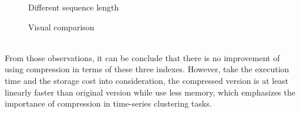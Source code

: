 \begin{figure}[!htbp]
    \centering 
    \caption{ Different sequence length} 
    \label{fig:comparison1} 
\end{figure} 
\begin{figure}[!htbp]
    \centering 
    \caption{ Visual comparison } 
    \label{fig:pippaavisul} 
\end{figure} 
\\From those observations, it can be conclude that there is no improvement of using compression in terms of these three indexes. However, take the execution time and the storage cost into consideration, the compressed version is at least linearly faster than original version while use less memory, which emphasizes the importance of compression in time-series clustering tasks. 